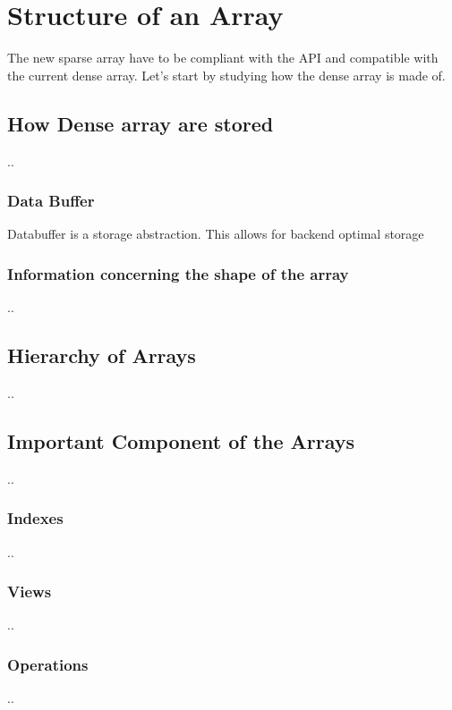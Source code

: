 \chapter{Structure of an Array}
The new sparse array have to be compliant with the API and compatible with the current dense array.
Let's start by studying how the dense array is made of.
\section{How Dense array are stored}
..
\subsection{Data Buffer}
Databuffer is a storage abstraction. This allows for backend optimal storage
\subsection{Information concerning the shape of the array}
..
\section{Hierarchy of Arrays}
..
\section{Important Component of the Arrays}
..
\subsection{Indexes}
..
\subsection{Views}
..
\subsection{Operations}
..